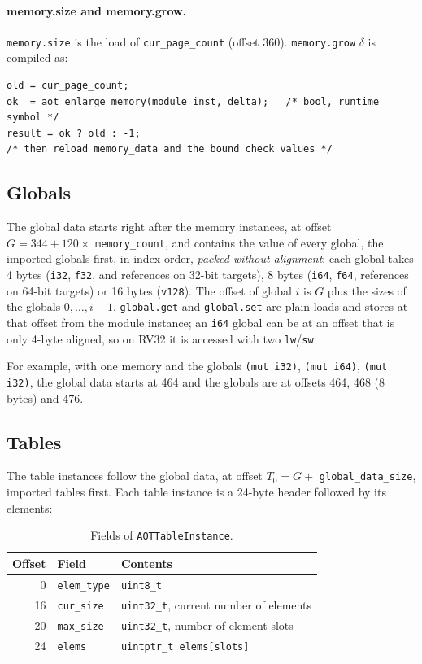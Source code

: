 \documentclass{article}
\begin{document}
\paragraph{memory.size and memory.grow.}
\verb|memory.size| is the load of \verb|cur_page_count| (offset 360).
\verb|memory.grow| $\delta$ is compiled as:
\begin{verbatim}
old = cur_page_count;
ok  = aot_enlarge_memory(module_inst, delta);   /* bool, runtime symbol */
result = ok ? old : -1;
/* then reload memory_data and the bound check values */
\end{verbatim}

\subsection{Globals}
\label{sec:abi-globals}
The global data starts right after the memory instances, at offset $G = 344 + 120 \times$ \verb|memory_count|, and contains the value of every global, the imported globals first, in index order, \emph{packed without alignment}: each global takes 4 bytes (\verb|i32|, \verb|f32|, and references on 32-bit targets), 8 bytes (\verb|i64|, \verb|f64|, references on 64-bit targets) or 16 bytes (\verb|v128|).
The offset of global $i$ is $G$ plus the sizes of the globals $0, \dots, i-1$.
\verb|global.get| and \verb|global.set| are plain loads and stores at that offset from the module instance; an \verb|i64| global can be at an offset that is only 4-byte aligned, so on RV32 it is accessed with two \verb|lw|/\verb|sw|.

For example, with one memory and the globals \verb|(mut i32)|, \verb|(mut i64)|, \verb|(mut i32)|, the global data starts at 464 and the globals are at offsets 464, 468 (8 bytes) and 476.

\subsection{Tables}
\label{sec:abi-tables}
The table instances follow the global data, at offset $T_0 = G +$ \verb|global_data_size|, imported tables first.
Each table instance is a 24-byte header followed by its elements:

\begin{table}[H]
\centering
\begin{tabular}{rll}
    \hline
    Offset & Field & Contents \\
    \hline
    0  & \verb|elem_type| & \verb|uint8_t| \\
    16 & \verb|cur_size| & \verb|uint32_t|, current number of elements \\
    20 & \verb|max_size| & \verb|uint32_t|, number of element slots \\
    24 & \verb|elems| & \verb|uintptr_t elems[slots]| \\
    \hline
\end{tabular}
\caption{Fields of \texttt{AOTTableInstance}.}
\label{table:table-inst}
\end{table}
\end{document}
